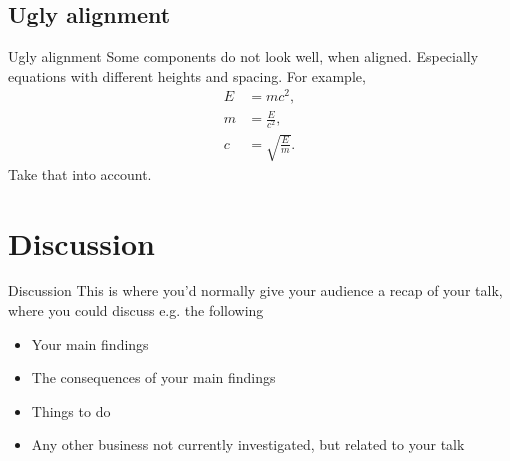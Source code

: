 \documentclass[aspectratio=169]{beamer}
\begin{document}
\subsection{Ugly alignment}
\begin{frame}{Ugly alignment}
  Some components do not look well, when aligned. Especially equations with different heights and spacing. For example,
    \begin{align}
        E &= mc^2,\\
    	m &= \frac{E}{c^2},\\
    	c &= \sqrt{\frac{E}{m}}.
    	\end{align}
    Take that into account.
\end{frame}

\section{Discussion}
\begin{frame}{Discussion}
This is where you’d normally give your audience a recap of your talk, where you could
discuss e.g. the following
\begin{itemize}
  \item Your main findings
  \item The consequences of your main findings
  \item Things to do
  \item Any other business not currently investigated, but related to your talk
\end{itemize}
\end{frame}
\end{document}
